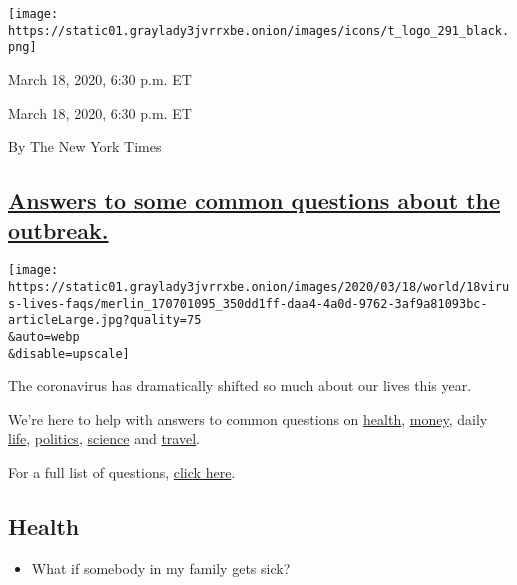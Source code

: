 \texttt{[image: https://static01.graylady3jvrrxbe.onion/images/icons/t\_logo\_291\_black.png]}

March 18, 2020, 6:30 p.m. ET

March 18, 2020, 6:30 p.m. ET

By The New York Times

\hypertarget{answers-to-some-common-questions-about-the-outbreak}{%
\subsection{\texorpdfstring{\protect\hyperlink{answers-to-some-common-questions-about-the-outbreak}{Answers
to some common questions about the
outbreak.}}{Answers to some common questions about the outbreak.}}\label{answers-to-some-common-questions-about-the-outbreak}}

\texttt{[image: https://static01.graylady3jvrrxbe.onion/images/2020/03/18/world/18virus-lives-faqs/merlin\_170701095\_350dd1ff-daa4-4a0d-9762-3af9a81093bc-articleLarge.jpg?quality=75\\\&auto=webp\\\&disable=upscale]}

The coronavirus has dramatically shifted so much about our lives this
year.

We're here to help with answers to common questions on
\href{https://www.nytimes3xbfgragh.onion/interactive/2020/world/coronavirus-tips-advice.html\#health}{health},
\href{https://www.nytimes3xbfgragh.onion/interactive/2020/world/coronavirus-tips-advice.html\#money}{money},
daily
\href{https://www.nytimes3xbfgragh.onion/interactive/2020/world/coronavirus-tips-advice.html\#life}{life},
\href{https://www.nytimes3xbfgragh.onion/interactive/2020/world/coronavirus-tips-advice.html\#politics}{politics},
\href{https://www.nytimes3xbfgragh.onion/interactive/2020/world/coronavirus-tips-advice.html\#science}{science}
and \href{http://travel/}{travel}.

For a full list of questions,
\href{https://www.nytimes3xbfgragh.onion/interactive/2020/world/coronavirus-tips-advice.html}{click
here}.

\hypertarget{health}{%
\subsection{Health}\label{health}}

\begin{itemize}
\tightlist
\item
  What if somebody in my family gets sick?
\end{itemize}

